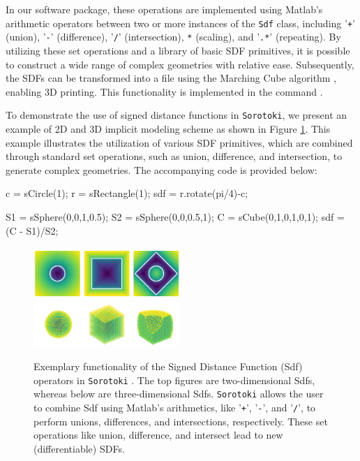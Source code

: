 In our software package, these operations are implemented using Matlab's arithmetic operators between two or more instances of the \texttt{Sdf} class, including '\texttt{+}' (union), '\texttt{-}' (difference), '\texttt{/}' (intersection), \texttt{*} (scaling), and '\texttt{.*}' (repeating). By utilizing these set operations and a library of basic SDF primitives, it is possible to construct a wide range of complex geometries with relative ease. Subsequently, the SDFs can be transformed into a  file using the Marching Cube algorithm \cite{Lorensen1987Aug}, enabling 3D printing. This functionality is implemented in the command . \\

\begin{example}
To demonstrate the use of signed distance functions in \texttt{Sorotoki}, we present an example of 2D and 3D implicit modeling scheme as shown in Figure \ref{fig:C5:sdfexample}. This example illustrates the utilization of various SDF primitives, which are combined through standard set operations, such as union, difference, and intersection, to generate complex geometries. The accompanying code is provided below:
\end{example}

\begin{matlabcode}
c   = sCircle(1);
r   = sRectangle(1);
sdf = r.rotate(pi/4)-c;

S1  = sSphere(0,0,1,0.5);
S2  = sSphere(0,0,0.5,1);
C   = sCube(0,1,0,1,0,1);
sdf = (C - S1)/S2;
\end{matlabcode}

\begin{figure}[!t]
\centering
\includegraphics*[width=0.495\textwidth]{./pdf/thesis-figure-6-3-1.pdf}
\includegraphics*[width=0.495\textwidth]{./pdf/thesis-figure-6-3-2.pdf}
%
\caption{Exemplary functionality of the Signed Distance Function (Sdf) operators in \texttt{Sorotoki} . The top figures are two-dimensional Sdfs, whereas below are three-dimensional Sdfs. \texttt{Sorotoki} allows the user to combine Sdf using Matlab's arithmetics, like '\texttt{+}', '\texttt{-}', and '\texttt{/}', to perform unions, differences, and intersections, respectively. These set operations like union, difference, and intersect lead to new (differentiable) SDFs.\label{fig:C5:sdfexample}}
\vspace{-3mm}
\end{figure}

